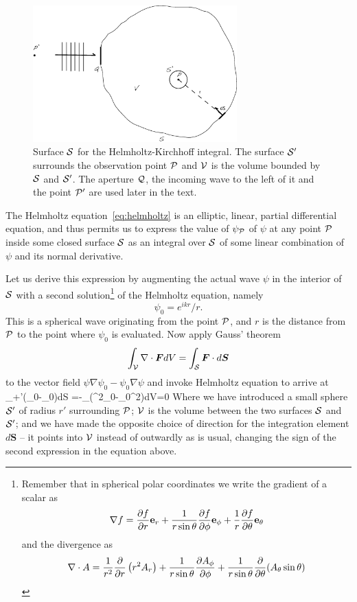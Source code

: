 \begin{figure}[th!]
	\centering
	\includegraphics[width=0.7\textwidth]{helmholz-kirchhoff-surface.eps}
  \caption{Surface $\cal{S}$ for the Helmholtz-Kirchhoff integral. The surface
$\cal{S'}$ surrounds the observation point $\cal{P}$ and $\cal{V}$ is the 
volume bounded by $\cal{S}$ and $\cal{S'}$. The aperture $\cal{Q}$, the 
incoming wave to the left of it and the point $\cal{P'}$ are used later in the
text.}
  \label{fig:helmholz-kirchhoff-surface}
\end{figure}

The Helmholtz equation~\ref{eq:helmholtz} is an elliptic, linear, partial differential equation,
and thus permits us to express the value of $\psi_{\cal P}$ of $\psi$ at any point ${\cal P}$ inside
some closed surface ${\cal S}$ as an integral over ${\cal S}$ of some linear combination of $\psi$ 
and its normal derivative. 

Let us derive this expression by augmenting the actual wave $\psi$ in the interior of ${\cal S}$
with a second solution\footnote{Remember that in spherical polar coordinates we
write the gradient of a scalar as 
\[
\nabla f={\partial f\over\partial r}{\bf e}_r
     +{1\over r\sin\theta}{\partial f\over\partial\phi}{\bf e}_\phi
     +{1\over r}{\partial f\over\partial\theta}{\bf e}_\theta
\] 
and the divergence as 
\[
{\nabla\cdot A}={1\over r^2}{\partial\over\partial r}\left(r^2A_r\right)
+{1\over r\sin\theta}{\partial A_\phi\over\partial\phi}
+{1\over r\sin\theta}{\partial\over\partial\theta}(A_\theta\sin\theta)
\]} of the Helmholtz equation, namely
\[
\psi_0={e^{ikr}/r}.
\]
This is a spherical wave originating from the point ${\cal P}$, and $r$ is the distance from 
${\cal P}$ to the point where $\psi_0$ is evaluated. Now apply Gauss' theorem 
\[
\int_{\cal V}\nabla\cdot{\bm F}dV=\int_{\cal S}{\bm F}\cdot d{\bm S}
\]
to the vector field $\psi\nabla\psi_0-\psi_0\nabla\psi$ and invoke Helmholtz equation to 
arrive at 
\be
\int_{+'}(\psi\nabla\psi_0-\psi_0\nabla\psi)\cdot d{\bm S}
           =-\int_(\psi\nabla^2\psi_0-\psi_0\nabla^2\psi)dV=0
\label{eq:exercise-1-eq}
\ee
Where we have introduced a small sphere ${\cal S}'$ of radius $r'$ surrounding ${\cal P}$; ${\cal V}$
is the volume between the two surfaces ${\cal S}$ and ${\cal S}'$; and we have made the opposite 
choice of direction for the integration element $d{\bm S}$ -- it points into ${\cal V}$ instead
of outwardly as is usual, changing the sign of the second expression in the equation above. 


